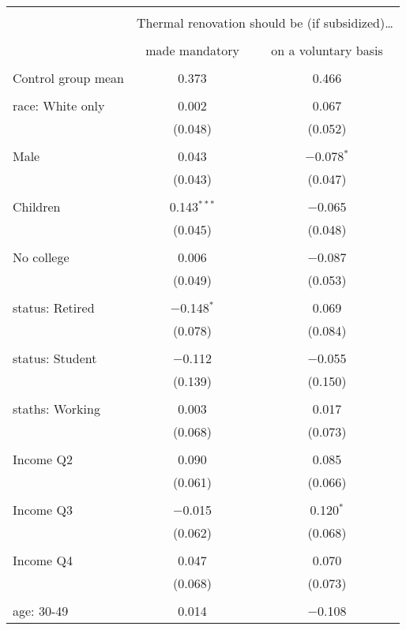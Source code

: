 
\begin{tabular}{@{\extracolsep{5pt}}lcc} 
\\[-1.8ex]\hline 
\hline \\[-1.8ex] 
 & \multicolumn{2}{c}{Thermal renovation should be (if subsidized)…} \\ 
\cline{2-3} 
\\[-1.8ex] & made mandatory & on a voluntary basis \\ 
\hline \\[-1.8ex] 
 Control group mean & 0.373 & 0.466  \\ \hline \\[-1.8ex] race: White only & 0.002 & 0.067 \\ 
  & (0.048) & (0.052) \\ 
  & & \\ 
 Male & 0.043 & $-$0.078$^{*}$ \\ 
  & (0.043) & (0.047) \\ 
  & & \\ 
 Children & 0.143$^{***}$ & $-$0.065 \\ 
  & (0.045) & (0.048) \\ 
  & & \\ 
 No college & 0.006 & $-$0.087 \\ 
  & (0.049) & (0.053) \\ 
  & & \\ 
 status: Retired & $-$0.148$^{*}$ & 0.069 \\ 
  & (0.078) & (0.084) \\ 
  & & \\ 
 status: Student & $-$0.112 & $-$0.055 \\ 
  & (0.139) & (0.150) \\ 
  & & \\ 
 staths: Working & 0.003 & 0.017 \\ 
  & (0.068) & (0.073) \\ 
  & & \\ 
 Income Q2 & 0.090 & 0.085 \\ 
  & (0.061) & (0.066) \\ 
  & & \\ 
 Income Q3 & $-$0.015 & 0.120$^{*}$ \\ 
  & (0.062) & (0.068) \\ 
  & & \\ 
 Income Q4 & 0.047 & 0.070 \\ 
  & (0.068) & (0.073) \\ 
  & & \\ 
 age: 30-49 & 0.014 & $-$0.108 \\ 

\end{tabular}
